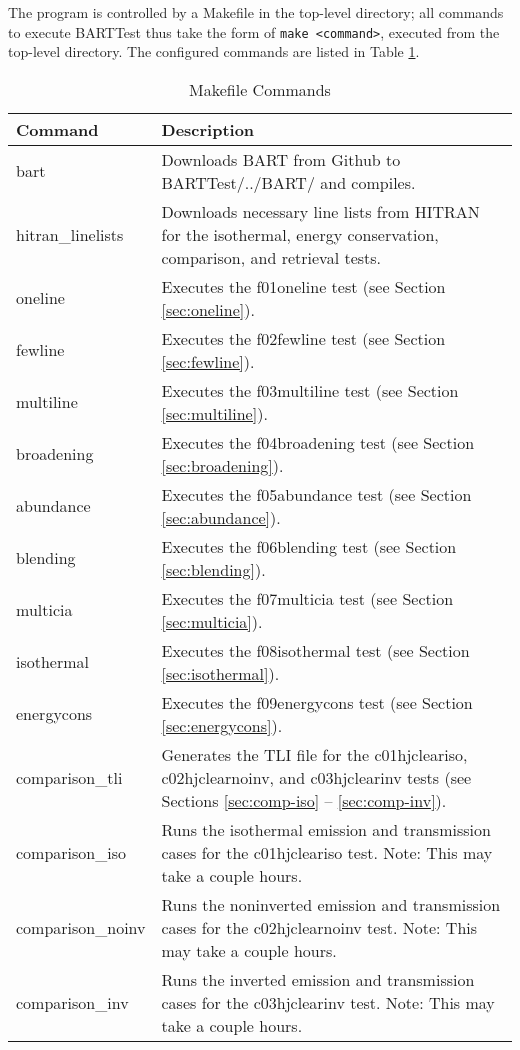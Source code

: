 \documentclass[letterpaper, 12pt]{article}
\begin{document}
The program is controlled by a Makefile in the top-level directory; all 
commands to execute BARTTest thus take the form of 
\texttt{make {\textless}command{\textgreater}}, executed 
from the top-level directory. The configured commands are listed in 
Table \ref{tbl:makecommands}.

\begin{table}[ht]
\label{tbl:makecommands}
\centering
\caption{Makefile Commands}
\begin{tabular}{ll}
\hline\hline
Command & Description\\
\hline
bart & Downloads BART from Github to BARTTest/../BART/ and compiles.\\
hitran{\_}linelists & Downloads necessary line lists from HITRAN for the 
isothermal, energy conservation, comparison, and retrieval tests.\\
oneline    & Executes the f01oneline test (see Section \ref{sec:oneline}).\\
fewline    & Executes the f02fewline test (see Section \ref{sec:fewline}).\\
multiline  & Executes the f03multiline test (see Section \ref{sec:multiline}).\\
broadening & Executes the f04broadening test (see Section \ref{sec:broadening}).\\
abundance  & Executes the f05abundance test (see Section \ref{sec:abundance}).\\
blending   & Executes the f06blending test (see Section \ref{sec:blending}).\\
multicia   & Executes the f07multicia test (see Section \ref{sec:multicia}).\\
isothermal & Executes the f08isothermal test (see Section \ref{sec:isothermal}).\\
energycons & Executes the f09energycons test (see Section \ref{sec:energycons}).\\
comparison{\_}tli & Generates the TLI file for the c01hjcleariso, c02hjclearnoinv, and c03hjclearinv tests (see Sections \ref{sec:comp-iso} -- \ref{sec:comp-inv}).\\
comparison{\_}iso & Runs the isothermal emission and transmission cases for the c01hjcleariso test. Note: This may take a couple hours.\\
comparison{\_}noinv & Runs the noninverted emission and transmission cases for the c02hjclearnoinv test. Note: This may take a couple hours.\\
comparison{\_}inv & Runs the inverted emission and transmission cases for the c03hjclearinv test. Note: This may take a couple hours.\\

\end{tabular}
\end{table}
\end{document}
